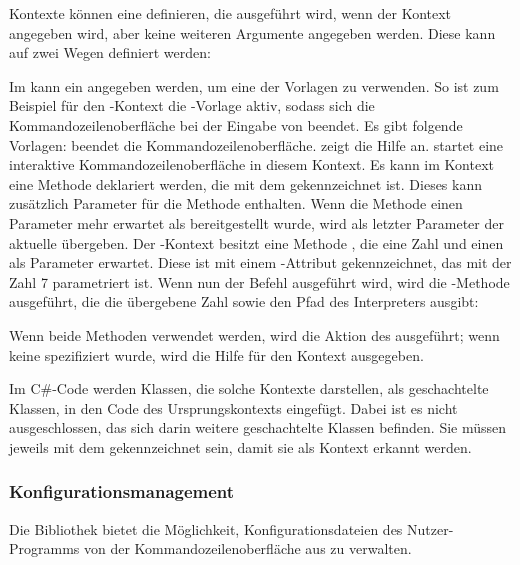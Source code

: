 Kontexte können eine  definieren, die ausgeführt wird, wenn der Kontext angegeben wird, aber keine weiteren Argumente angegeben werden.
Diese kann auf zwei Wegen definiert werden:
\begin{outline}
 \1 Im  kann ein  angegeben werden, um eine der Vorlagen zu verwenden.
 So ist zum Beispiel für den -Kontext die -Vorlage aktiv,
 sodass sich die Kommandozeilenoberfläche bei der Eingabe von  beendet.
 Es gibt folgende Vorlagen:
 \2  beendet die Kommandozeilenoberfläche.
 \2  zeigt die Hilfe an.
 \2  startet eine interaktive Kommandozeilenoberfläche in diesem Kontext.
 \1 Es kann im Kontext eine Methode deklariert werden, die mit dem  gekennzeichnet ist.
 Dieses kann zusätzlich Parameter für die Methode enthalten.
 Wenn die Methode einen Parameter mehr erwartet als bereitgestellt wurde, wird als letzter Parameter der aktuelle  übergeben.
 Der -Kontext besitzt eine Methode ,
 die eine Zahl und einen  als Parameter erwartet.
 Diese ist mit einem -Attribut gekennzeichnet, das mit der Zahl 7 parametriert ist.
 Wenn nun der Befehl  ausgeführt wird, wird die -Methode ausgeführt, die die übergebene Zahl sowie den Pfad des Interpreters ausgibt:
\end{outline}
Wenn beide Methoden verwendet werden, wird die Aktion des  ausgeführt;
wenn keine spezifiziert wurde, wird die Hilfe für den Kontext ausgegeben.

Im C\#-Code werden Klassen, die solche Kontexte darstellen, als geschachtelte Klassen, in den Code des Ursprungskontexts eingefügt.
Dabei ist es nicht ausgeschlossen, das sich darin weitere geschachtelte Klassen befinden.
Sie müssen jeweils mit dem  gekennzeichnet sein, damit sie als Kontext erkannt werden.  
 

\subsubsection{Konfigurationsmanagement}\label{ConfigurationManagement}
Die Bibliothek bietet die Möglichkeit, Konfigurationsdateien des Nutzer-Programms von der Kommandozeilenoberfläche aus zu verwalten.

